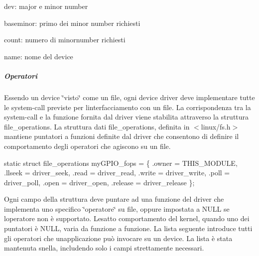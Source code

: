 \begin{DoxyItemize}
\item dev\+: major e minor number
\item baseminor\+: primo dei minor number richiesti
\item count\+: numero di minornumber richiesti
\item name\+: nome del device
\end{DoxyItemize}

\subparagraph*{Operatori}

Essendo un device \char`\"{}visto\char`\"{} come un file, ogni device driver deve implementare tutte le system-\/call previste per l\textquotesingle{}interfacciamento con un file. La corrispondenza tra la system-\/call e la funzione fornita dal driver viene stabilita attraverso la struttura file\+\_\+operations. La struttura dati file\+\_\+operations, definita in $<$linux/fs.\+h$>$ mantiene puntatori a funzioni definite dal driver che consentono di definire il comportamento degli operatori che agiscono su un file. 
\begin{DoxyCode}
\textcolor{keyword}{static} \textcolor{keyword}{struct }file\_operations myGPIO\_fops = \{
    .owner      = THIS\_MODULE,
    .llseek     = driver\_seek,
    .read       = driver\_read,
    .write      = driver\_write,
    .poll       = driver\_poll,
    .open       = driver\_open,
    .release    = driver\_release
\};
\end{DoxyCode}
 Ogni campo della struttura deve puntare ad una funzione del driver che implementa uno specifico \char`\"{}operatore\char`\"{} su file, oppure impostata a N\+U\+LL se l\textquotesingle{}operatore non è supportato. L\textquotesingle{}esatto comportamento del kernel, quando uno dei puntatori è N\+U\+LL, varia da funzione a funzione. La lista seguente introduce tutti gli operatori che un\textquotesingle{}applicazione può invocare su un device. La lista è stata mantenuta snella, includendo solo i campi strettamente necessari.


